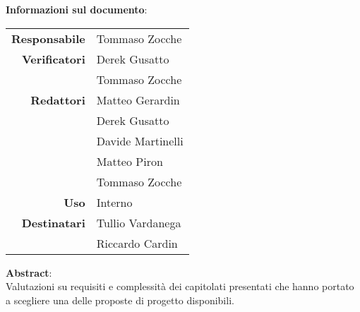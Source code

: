 \begin{center}
\textbf{Informazioni sul documento}: \\
\vspace{0.5cm}

\begin{tabular}{r|l}
    \textbf{Responsabile} &  Tommaso Zocche \\ 
    \textbf{Verificatori} & Derek Gusatto \\ & Tommaso Zocche \\ 
    \textbf{Redattori} & Matteo Gerardin \\ & Derek Gusatto \\ & Davide Martinelli \\ & Matteo Piron \\ & Tommaso Zocche \\ 
    \textbf{Uso} & Interno\\ 
    \textbf{Destinatari} & Tullio Vardanega \\ & Riccardo Cardin \\ 
\end{tabular}

\vfill
\vspace{0.5cm}
\textbf{Abstract}: \\
\vspace{0.5cm}
Valutazioni su requisiti e complessità dei capitolati presentati che hanno portato a scegliere una delle proposte di progetto disponibili.
\end{center}


\bigskip